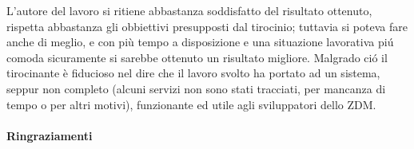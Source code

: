\documentclass[a4paper,12pt,titlepage,italian,openany]{report}
\begin{document}
L'autore del lavoro si ritiene abbastanza soddisfatto del risultato ottenuto, rispetta abbastanza gli obbiettivi presupposti dal tirocinio; tuttavia si poteva fare anche di meglio, e con più tempo a disposizione e una situazione lavorativa piú comoda sicuramente si sarebbe ottenuto un risultato migliore. 
Malgrado ció il tirocinante è fiducioso nel dire che il lavoro svolto ha portato ad un sistema, seppur non completo (alcuni servizi non sono stati tracciati, per mancanza di tempo o per altri motivi), funzionante ed utile agli sviluppatori dello ZDM\cite{zdm:1}.


\appendix



 
\paragraph{Ringraziamenti}
\end{document}
